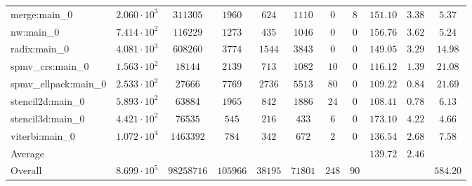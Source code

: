\begin{tabular}{|l|c|c|c|c|c|c|c|c|c|c|}
merge:main\_0          & $ 2.060 \cdot 10^{3} $ & $ 311305   $ & $ 1960   $ & $ 624   $ & $ 1110  $ & $ 0   $ & $ 8  $ & $ 151.10      $ & $ 3.38    $ & $ 5.37    $ \\
nw:main\_0             & $ 7.414 \cdot 10^{2} $ & $ 116229   $ & $ 1273   $ & $ 435   $ & $ 1046  $ & $ 0   $ & $ 0  $ & $ 156.76      $ & $ 3.62    $ & $ 5.24    $ \\
radix:main\_0          & $ 4.081 \cdot 10^{3} $ & $ 608260   $ & $ 3774   $ & $ 1544  $ & $ 3843  $ & $ 0   $ & $ 0  $ & $ 149.05      $ & $ 3.29    $ & $ 14.98   $ \\
spmv\_crs:main\_0      & $ 1.563 \cdot 10^{2} $ & $ 18144    $ & $ 2139   $ & $ 713   $ & $ 1082  $ & $ 10  $ & $ 0  $ & $ 116.12      $ & $ 1.39    $ & $ 21.08   $ \\
spmv\_ellpack:main\_0  & $ 2.533 \cdot 10^{2} $ & $ 27666    $ & $ 7769   $ & $ 2736  $ & $ 5513  $ & $ 80  $ & $ 0  $ & $ 109.22      $ & $ 0.84    $ & $ 21.69   $ \\
stencil2d:main\_0      & $ 5.893 \cdot 10^{2} $ & $ 63884    $ & $ 1965   $ & $ 842   $ & $ 1886  $ & $ 24  $ & $ 0  $ & $ 108.41      $ & $ 0.78    $ & $ 6.13    $ \\
stencil3d:main\_0      & $ 4.421 \cdot 10^{2} $ & $ 76535    $ & $ 545    $ & $ 216   $ & $ 433   $ & $ 6   $ & $ 0  $ & $ 173.10      $ & $ 4.22    $ & $ 4.66    $ \\
viterbi:main\_0        & $ 1.072 \cdot 10^{4} $ & $ 1463392  $ & $ 784    $ & $ 342   $ & $ 672   $ & $ 2   $ & $ 0  $ & $ 136.54      $ & $ 2.68    $ & $ 7.58    $ \\
\hline
Average                & $                    $ & $          $ & $        $ & $       $ & $       $ & $     $ & $    $ & $ 139.72      $ & $ 2.46    $ & $         $ \\
\hline
Overall                & $ 8.699 \cdot 10^{5} $ & $ 98258716 $ & $ 105966 $ & $ 38195 $ & $ 71801 $ & $ 248 $ & $ 90 $ & $             $ & $         $ & $ 584.20  $ \\
\hline
\end{tabular}
